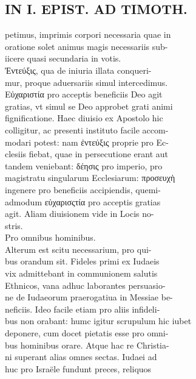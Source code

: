 \documentclass{article}
\begin{document}
\begin{pages}
\section*{IN I. EPIST. AD TIMOTH. \\
                }
petimus, imprimis corpori necessaria quae in \\
                oratione solet animus magis necessariis sub- \\
                iicere quasi secundaria in votis. \\
                Ἐντεύξις, qua de iniuria illata conqueri- \\
                mur, proque aduersariis simul intercedimus. \\
                Εὐχαριστία pro acceptis beneficiis Deo agit \\
                gratias, vt simul se Deo approbet grati animi \\
                fignificatione. Haec diuisio ex Apostolo hic \\
                colligitur, ac presenti instituto facile accom- \\
                modari potest: nam ἐντεύξις proprie pro Ec- \\
                clesiis fiebat, quae in persecutione erant aut \\
                tandem veniebant: δέησις pro imperio, pro \\
                magistratu singularum Ecclesiarum: προσευχὴ \\
                ingenere pro beneficiis accipiendis, quemi- \\
                admodum εὐχαρισςτία pro acceptis gratias \\
                agit. Aliam diuisionem vide in Locis no- \\
                stris. \\
                Pro omnibus hominibus. \\
                Alterum est scitu necessarium, pro qui- \\
                bus orandum sit. Fideles primi ex Iudaeis \\
                vix admittebant in communionem salutis \\
                Ethnicos, vana adhuc laborantes persuasio- \\
                ne de Iudaeorum praerogatiua in Messiae be- \\
                neficiis. Ideo facile etiam pro aliis infideli- \\
                bus non orabant: humc igitur scrupulum hic iubet \\
                deponere, cum docet pietatis esse pro omni- \\
                bus hominibus orare. Atque hac re Christia- \\
                ni superant alias omnes sectas. Iudaei ad \\
                huc pro Israële fundunt preces, reliquos \\
                

\end{pages}
\end{document}
